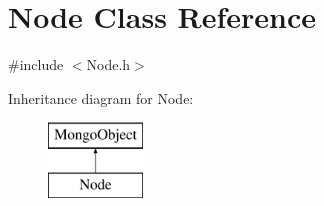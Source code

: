 \hypertarget{class_node}{}\section{Node Class Reference}
\label{class_node}


{\ttfamily \#include $<$Node.\+h$>$}

Inheritance diagram for Node\+:\begin{figure}[H]
\begin{center}
\leavevmode
\includegraphics[height=2.000000cm]{class_node}
\end{center}
\end{figure}
